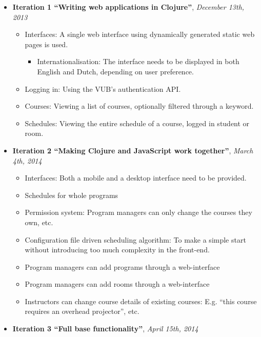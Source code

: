 \documentclass[12pt]{article}
\begin{document}
\begin{itemize}
\itemsep1pt\parskip0pt
\item
  \textbf{Iteration 1 ``Writing web applications in Clojure''},
  \emph{December 13th, 2013}

  \begin{itemize}
  \itemsep1pt\parskip0pt
  \item
    Interfaces: A single web interface using dynamically generated
    static web pages is used.

    \begin{itemize}
    \itemsep1pt\parskip0pt
    \item
      Internationalisation: The interface needs to be displayed in both
      English and Dutch, depending on user preference.
    \end{itemize}
  \item
    Logging in: Using the VUB's authentication API.
  \item
    Courses: Viewing a list of courses, optionally filtered through a
    keyword.
  \item
    Schedules: Viewing the entire schedule of a course, logged in
    student or room.
  \end{itemize}
\item
  \textbf{Iteration 2 ``Making Clojure and JavaScript work together''},
  \emph{March 4th, 2014}

  \begin{itemize}
  \itemsep1pt\parskip0pt
  \item
    Interfaces: Both a mobile and a desktop interface need to be
    provided.
  \item
    Schedules for whole programs
  \item
    Permission system: Program managers can only change the courses they
    own, etc.
  \item
    Configuration file driven scheduling algorithm: To make a simple
    start without introducing too much complexity in the front-end.
  \item
    Program managers can add programs through a web-interface
  \item
    Program managers can add rooms through a web-interface
  \item
    Instructors can change course details of existing courses: E.g.
    ``this course requires an overhead projector'', etc.
  \end{itemize}
\item
  \textbf{Iteration 3 ``Full base functionality''}, \emph{April 15th,
  2014}


\end{itemize}
\end{document}
